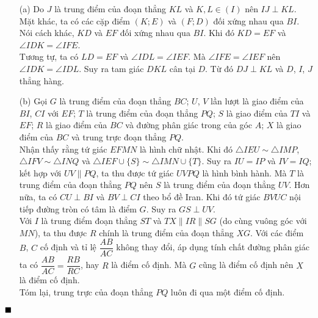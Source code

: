 \documentclass{article} %
\newenvironment{solution}[1][Lời giải]{%
  \proof[\faPenNib \hspace{0.2cm} \ttfamily \scshape \large #1]%
}{\(\hfill \blacksquare\){\parfillskip0pt\par}}
\begin{document}
        \begin{solution}
            \hfill
            \begin{itemize}
                \item[(a)] Do \(J\) là trung điểm của đoạn thẳng \(KL\) và \(K, L \in (I)\) nên \(IJ \perp KL\).\\
                Mặt khác, ta có các cặp điểm \((K;E)\) và \((F;D)\) đối xứng nhau qua \(BI\). Nói cách khác, \(KD\) và \(EF\) đối xứng nhau qua \(BI\). Khi đó \(KD = EF\) và \(\angle IDK = \angle IFE\).\\
                Tương tự, ta có \(LD = EF\) và \(\angle IDL = \angle IEF\). Mà \(\angle IFE = \angle IEF\) nên \(\angle IDK = \angle IDL\). Suy ra tam giác \(DKL\) cân tại \(D\). Từ đó \(DJ \perp KL\) và \(D\), \(I\), \(J\) thẳng hàng.
                \item[(b)] Gọi \(G\) là trung điểm của đoạn thẳng \(BC\); \(U\), \(V\) lần lượt là giao điểm của \(BI\), \(CI\) với \(EF\); \(T\) là trung điểm của đoạn thẳng \(PQ\); \(S\) là giao điểm của \(TI\) và \(EF\); \(R\) là giao điểm của \(BC\) và đường phân giác trong của góc \(A\); \(X\) là giao điểm của \(BC\) và trung trực đoạn thẳng \(PQ\).\\
                Nhận thấy rằng tứ giác \(EFMN\) là hình chữ nhật. Khi đó \(\triangle IEU \sim \triangle IMP\), \(\triangle IFV \sim \triangle INQ\) và \(\triangle IEF \cup \{S\} \sim \triangle IMN \cup \{T\}\). Suy ra \(IU = IP\) và \(IV = IQ\); kết hợp với \(UV \parallel PQ\), ta thu được tứ giác \(UVPQ\) là hình bình hành. Mà \(T\) là trung điểm của đoạn thẳng \(PQ\) nên \(S\) là trung điểm của đoạn thẳng \(UV\). Hơn nữa, ta có \(CU \perp BI\) và \(BV \perp CI\) theo bổ đề Iran. Khi đó tứ giác \(BVUC\) nội tiếp đường tròn có tâm là điểm \(G\). Suy ra \(GS \perp UV\).\\
                Với \(I\) là trung điểm đoạn thẳng \(ST\) và \(TX \parallel IR \parallel SG\) (do cùng vuông góc với \(MN\)), ta thu được \(R\) chính là trung điểm của đoạn thẳng \(XG\). Với các điểm \(B\), \(C\) cố định và tỉ lệ \(\dfrac{AB}{AC}\) không thay đổi, áp dụng tính chất đường phân giác ta có \(\dfrac{AB}{AC} = \dfrac{RB}{RC}\), hay \(R\) là điểm cố định. Mà \(G\) cũng là điểm cố định nên \(X\) là điểm cố định.\\
                Tóm lại, trung trực của đoạn thẳng \(PQ\) luôn đi qua một điểm cố định.
            \end{itemize}
        \end{solution}
        
\end{document}
